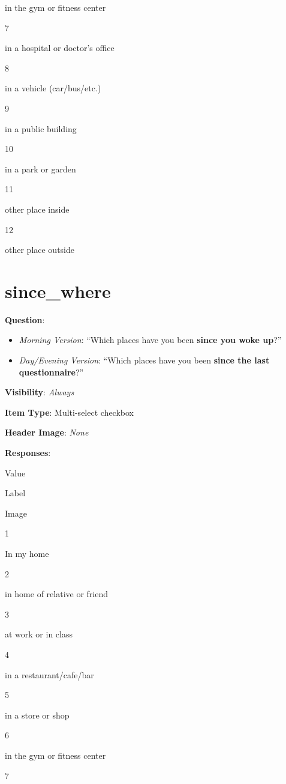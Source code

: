 \documentclass[]{book}
\providecommand{\tightlist}{%
  \setlength{\itemsep}{0pt}\setlength{\parskip}{0pt}}
\begin{document}
in the gym or fitness center

7

in a hospital or doctor's office

8

in a vehicle (car/bus/etc.)

9

in a public building

10

in a park or garden

11

other place inside

12

other place outside

\hypertarget{since_where}{%
\section{since\_where}\label{since_where}}

\textbf{Question}:

\begin{itemize}
\tightlist
\item
  \emph{Morning Version}: ``Which places have you been \textbf{since you woke up}?''
\item
  \emph{Day/Evening Version}: ``Which places have you been \textbf{since the last questionnaire}?''
\end{itemize}

\textbf{Visibility}: \emph{Always}

\textbf{Item Type}: Multi-select checkbox

\textbf{Header Image}: \emph{None}

\textbf{Responses}:

Value

Label

Image

1

In my home

2

in home of relative or friend

3

at work or in class

4

in a restaurant/cafe/bar

5

in a store or shop

6

in the gym or fitness center

7
\end{document}
